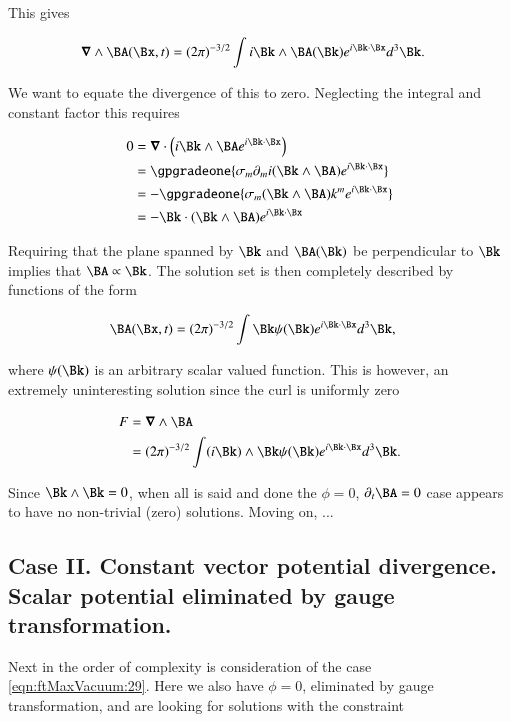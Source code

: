 This gives

\begin{align}\label{eqn:ftMaxVacuum:52}
\spacegrad \wedge \BA(\Bx, t) &= (2 \pi)^{-3/2} \int i \Bk \wedge \BA(\Bk) e^{i \Bk \cdot \Bx } d^3 \Bk.
\end{align}

We want to equate the divergence of this to zero.  Neglecting the integral and constant factor this requires

\begin{align*}
0 
&= 
\spacegrad \cdot \left( i \Bk \wedge \BA e^{i\Bk \cdot \Bx} \right) \\
&= 
\gpgradeone{ \sigma_m \partial_m i (\Bk \wedge \BA) e^{i\Bk \cdot \Bx} } \\
&= 
-\gpgradeone{ \sigma_m (\Bk \wedge \BA) k^m e^{i\Bk \cdot \Bx} } \\
&= 
-\Bk \cdot (\Bk \wedge \BA) e^{i\Bk \cdot \Bx} \\
\end{align*}

Requiring that the plane spanned by $\Bk$ and $\BA(\Bk)$ be perpendicular to $\Bk$ implies that $\BA \propto \Bk$.  The solution set is then completely described by functions of the form

\begin{align}\label{eqn:ftMaxVacuum:53}
\BA(\Bx, t) &= (2 \pi)^{-3/2} \int \Bk \psi(\Bk) e^{i \Bk \cdot \Bx } d^3 \Bk,
\end{align}

where $\psi(\Bk)$ is an arbitrary scalar valued function.  This is however, an extremely uninteresting solution since the curl is uniformly zero

\begin{align*}
F 
&= \spacegrad \wedge \BA \\
&= (2 \pi)^{-3/2} \int (i \Bk) \wedge \Bk \psi(\Bk) e^{i \Bk \cdot \Bx } d^3 \Bk.
\end{align*}

Since $\Bk \wedge \Bk = 0$, when all is said and done the $\phi = 0$, $\partial_t \BA = 0$ case appears to have no non-trivial (zero) solutions.  Moving on, ...

\subsection{Case II.  Constant vector potential divergence.  Scalar potential eliminated by gauge transformation.}

Next in the order of complexity is consideration of the case \autoref{eqn:ftMaxVacuum:29}.  Here we also have $\phi = 0$, eliminated by gauge transformation, and are looking for solutions with the constraint

